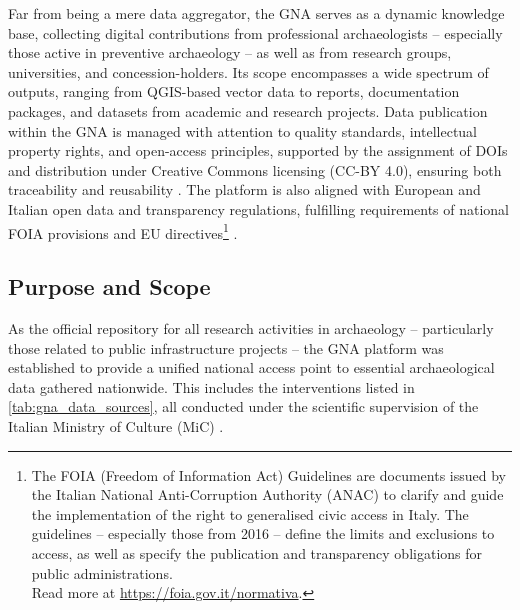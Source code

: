 \begin{spacing}{1.5}
Far from being a mere data aggregator, the GNA serves as a dynamic knowledge base, collecting digital contributions from professional archaeologists -- especially those active in preventive archaeology -- as well as from research groups, universities, and concession-holders. Its scope encompasses a wide spectrum of outputs, ranging from QGIS-based vector data to reports, documentation packages, and datasets from academic and research projects. Data publication within the GNA is managed with attention to quality standards, intellectual property rights, and open-access principles, supported by the assignment of DOIs and distribution under Creative Commons licensing (CC-BY 4.0), ensuring both traceability and reusability \citep{acconcia_pubblicazione_2023,falcone_dematerializzazione_2023,boi_il_2023}. The platform is also aligned with European and Italian open data and transparency regulations, fulfilling requirements of national FOIA provisions and EU directives\footnote{The FOIA (Freedom of Information Act) Guidelines are documents issued by the Italian National Anti-Corruption Authority (ANAC) to clarify and guide the implementation of the right to generalised civic access in Italy. The guidelines -- especially those from 2016 -- define the limits and exclusions to access, as well as specify the publication and transparency obligations for public administrations.\\Read more at \url{https://foia.gov.it/normativa}.\nocite{noauthor_normativa_2016}} \citep{falcone_dematerializzazione_2023}.

\subsection{Purpose and Scope}
As the official repository for all research activities in archaeology -- particularly those related to public infrastructure projects -- the GNA platform was established to provide a unified national access point to essential archaeological data gathered nationwide. This includes the interventions listed in \autoref{tab:gna_data_sources}, all conducted under the scientific supervision of the Italian Ministry of Culture (MiC) \citep{acconcia_pubblicazione_2023,falcone_dematerializzazione_2023}.


\end{spacing}
